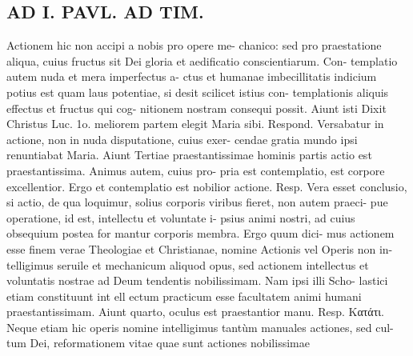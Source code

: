 \documentclass{article}
\begin{document}
\begin{pages}
\section*{AD I. PAVL. AD TIM. }
\marginpar{[ p.14 ]}\pstart Actionem hic non accipi a nobis pro opere me- chanico: sed pro praestatione aliqua, cuius fructus sit Dei gloria et aedificatio conscientiarum. Con- templatio autem nuda et mera imperfectus a- ctus et humanae imbecillitatis indicium potius est quam laus potentiae, si desit scilicet istius con- templationis aliquis effectus et fructus qui cog- nitionem nostram consequi possit.  \pend\pstart Aiunt isti Dixit Christus Luc. 1o. meliorem partem elegit Maria sibi. Respond. Versabatur in actione, non in nuda disputatione, cuius exer- cendae gratia mundo ipsi renuntiabat Maria.  \pend\pstart Aiunt Tertiae praestantissimae hominis partis actio est praestantissima. Animus autem, cuius pro- pria est contemplatio, est corpore excellentior. Ergo et contemplatio est nobilior actione. Resp. Vera esset conclusio, si actio, de qua loquimur, solius corporis viribus fieret, non autem praeci- pue operatione, id est, intellectu et voluntate i- psius animi nostri, ad cuius obsequium postea for mantur corporis membra. Ergo quum dici- mus actionem esse finem verae Theologiae et Christianae, nomine Actionis vel Operis non in- telligimus seruile et mechanicum aliquod opus, sed actionem intellectus et voluntatis nostrae ad Deum tendentis nobilissimam. Nam ipsi illi Scho- lastici etiam constituunt int ell ectum practicum esse facultatem animi humani praestantissimam.  \pend\pstart Aiunt quarto, oculus est praestantior manu. Resp. Κατάτι. Neque etiam hic operis nomine intelligimus tantùm manuales actiones, sed cul- tum Dei, reformationem vitae quae sunt actiones nobilissimae  \pend

\end{pages}
\end{document}
